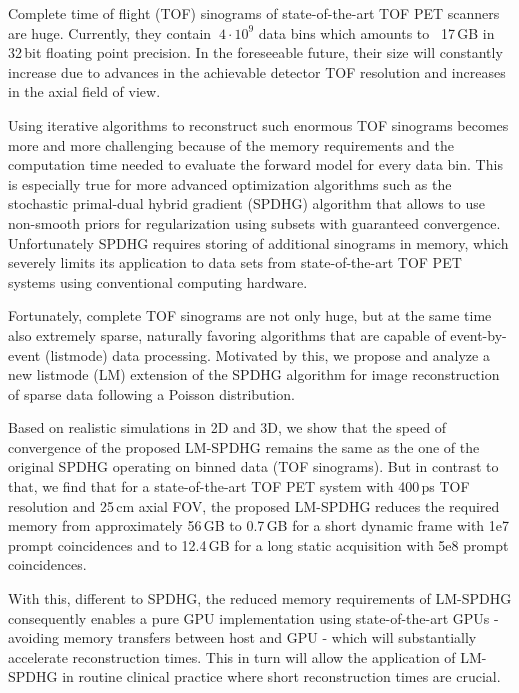 Complete time of flight (TOF) sinograms of state-of-the-art TOF PET scanners are huge.
Currently, they contain $~4 \cdot 10^9$ data bins which amounts to ~17\,GB in 32\,bit floating 
point precision.
In the foreseeable future, their size will constantly increase due to advances in the 
achievable detector TOF resolution and increases in the axial field of view.

Using iterative algorithms to reconstruct such enormous TOF sinograms becomes more and more
challenging because of the memory requirements and the computation time needed to evaluate the
forward model for every data bin.
This is especially true for more advanced optimization algorithms such as the
stochastic primal-dual hybrid gradient (SPDHG) algorithm that allows to use non-smooth priors
for regularization using subsets with guaranteed convergence.
Unfortunately SPDHG requires storing of additional sinograms in memory, which severely limits
its application to data sets from state-of-the-art TOF PET systems using conventional
computing hardware.

Fortunately, complete TOF sinograms are not only huge, but at the same time also extremely
sparse, naturally favoring algorithms that are capable of event-by-event (listmode) data
processing.
Motivated by this, we propose and analyze a new listmode (LM) extension of the SPDHG algorithm 
for image reconstruction of sparse data following a Poisson distribution.

Based on realistic simulations in 2D and 3D, we show that the speed of convergence of the proposed LM-SPDHG 
remains the same as the one of the original SPDHG operating on binned data (TOF sinograms).
But in contrast to that, we find that for a state-of-the-art TOF PET system with 400\,ps TOF resolution and 25\,cm axial FOV,
the proposed LM-SPDHG reduces the required memory from approximately 56\,GB to
0.7\,GB for a short dynamic frame with 1e7 prompt coincidences and to 12.4\,GB for a long 
static acquisition with 5e8 prompt coincidences.

With this, different to SPDHG, the reduced memory requirements of LM-SPDHG consequently enables 
a pure GPU implementation using state-of-the-art GPUs - avoiding memory transfers
between host and GPU - which will substantially accelerate reconstruction times.
This in turn will allow the application of LM-SPDHG in routine clinical practice where short
reconstruction times are crucial.
